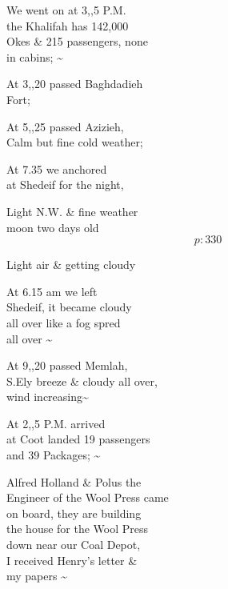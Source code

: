 \documentclass{report}
\begin{document}
	\par{
 	We went on at 3,,5 P.M.\ \\the Khalifah has 142,000\ \\Okes \& 215 passengers, none\ \\in cabins; \~{}\ \\
	}

	\par{
 	At 3,,20 passed Baghdadieh\ \\Fort;\ \\
	}

	\par{
 	At 5,,25 passed Azizieh,\ \\Calm but fine cold weather;\ \\
	}

	\par{
 	At 7.35 we anchored\ \\at Shedeif for the night,\ \\
	}

	\par{
 	Light N.W. \& fine weather\ \\moon two days old\ \\
  \[p: 330 \]

	}

	\par{
 	Light air \& getting cloudy\ \\
	}

	\par{
 	At 6.15 am we left\ \\Shedeif, it became cloudy\ \\all over like a fog spred\ \\all over \~{}\ \\
	}

	\par{
 	At 9,,20 passed Memlah,\ \\S.Ely breeze \& cloudy all over,\ \\wind increasing\~{}\ \\
	}

	\par{
 	At 2,,5 P.M. arrived\ \\at Coot landed 19 passengers\ \\and 39 Packages; \~{}\ \\
	}

	\par{
 	Alfred Holland \& Polus the\ \\Engineer of the Wool Press came\ \\on board, they are building\ \\the house for the Wool Press\ \\down near our Coal Depot,\ \\I received Henry’s letter \&\ \\my papers \~{}\ \\
	}
\end{document}
